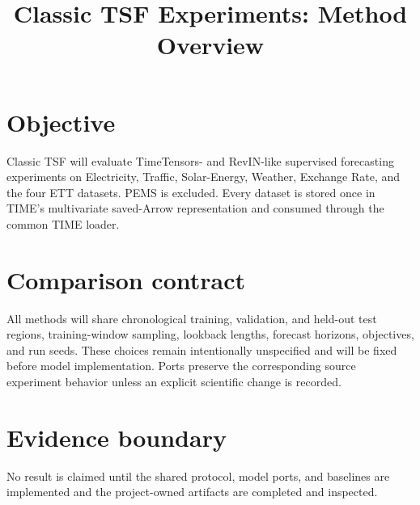 \documentclass[10pt]{article}
\title{Classic TSF Experiments: Method Overview}
\author{}
\date{}
\begin{document}
\maketitle

\section{Objective}

Classic TSF will evaluate TimeTensors- and RevIN-like supervised forecasting
experiments on Electricity, Traffic, Solar-Energy, Weather, Exchange Rate, and
the four ETT datasets. PEMS is excluded. Every dataset is stored once in TIME's
multivariate saved-Arrow representation and consumed through the common TIME
loader.

\section{Comparison contract}

All methods will share chronological training, validation, and held-out test
regions, training-window sampling, lookback lengths, forecast horizons,
objectives, and run seeds. These choices remain intentionally unspecified and
will be fixed before model implementation. Ports preserve the corresponding
source experiment behavior unless an explicit scientific change is recorded.

\section{Evidence boundary}

No result is claimed until the shared protocol, model ports, and baselines are
implemented and the project-owned artifacts are completed and inspected.
\end{document}
